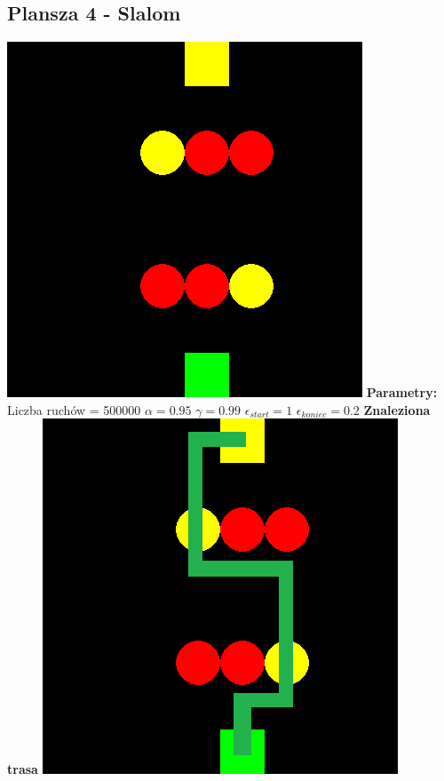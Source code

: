 \documentclass[a4paper,12pt]{article}
\begin{document}
\subsection{Plansza 4 - Slalom}
\includegraphics[scale=0.73]{testy/plansza4.png} \newline
\textbf{Parametry:}
Liczba ruchów = 500000
\newline \(\alpha = 0.95\)
\newline \(\gamma = 0.99\)
\newline \(\epsilon_{start} = 1\)
\newline \(\epsilon_{koniec} = 0.2\) \newline \newline
\textbf{\Large{Znaleziona trasa}} \newline \newline
\includegraphics[scale=0.73]{testy/plansza4trasa.png} \newline \newline
\end{document}
